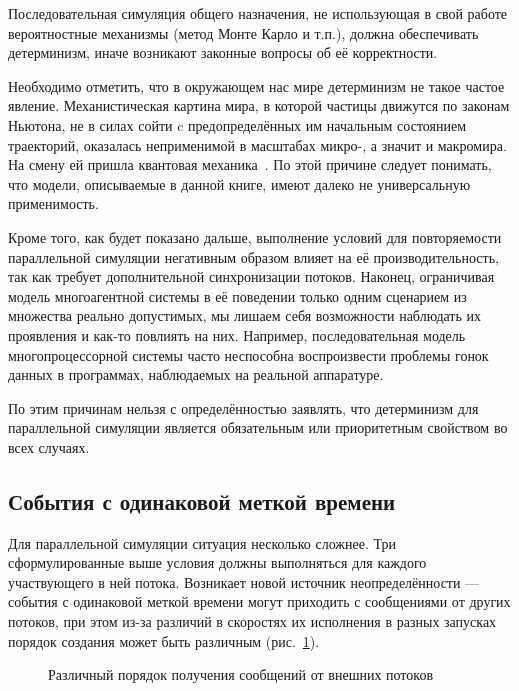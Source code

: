 Последовательная симуляция общего назначения, не использующая в свой работе вероятностные механизмы (метод Монте Карло и т.п.), должна обеспечивать детерминизм, иначе возникают законные вопросы об её корректности.

\begin{digression}
Необходимо отметить, что в окружающем нас мире детерминизм не такое частое явление. Механистическая картина мира, в которой частицы движутся по законам Ньютона, не в силах сойти c предопределённых им начальным состоянием траекторий, оказалась неприменимой в масштабах микро-, а значит и макромира. На смену ей пришла квантовая механика~\cite{ivanov-theorphys}. По этой причине следует понимать, что модели, описываемые в данной книге, имеют далеко не универсальную применимость.

Кроме того, как будет показано дальше, выполнение условий для повторяемости параллельной симуляции негативным образом влияет на её производительность, так как требует дополнительной синхронизации потоков. Наконец, ограничивая модель многоагентной системы в её поведении только одним сценарием из множества реально допустимых, мы лишаем себя возможности наблюдать их проявления и как-то повлиять на них. Например, последовательная модель многопроцессорной системы часто неспособна воспроизвести проблемы гонок данных в программах, наблюдаемых на реальной аппаратуре.

По этим причинам нельзя с определённостью заявлять, что детерминизм для параллельной симуляции является обязательным или приоритетным свойством во всех случаях.

\end{digression}

\subsection{События с одинаковой меткой времени}

Для параллельной симуляции ситуация несколько сложнее. Три сформулированные выше условия должны выполняться для каждого участвующего в ней потока. Возникает новой источник неопределённости — события с одинаковой меткой времени могут приходить с сообщениями от других потоков, при этом из-за различий в скоростях их исполнения в разных запусках порядок создания может быть различным (рис.~\ref{fig:same-time-stamp}). 

\begin{figure}[htbp]
    \centering
    \caption[Различный порядок получения сообщений от внешних потоков]{Различный порядок получения сообщений от внешних потоков}
    \label{fig:same-time-stamp}
\end{figure}


